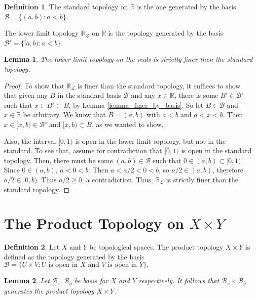 \documentclass{report}
\newtheorem{lemma}{Lemma}[section]
\theoremstyle{definition}
\newtheorem{definition}{Definition}[section]
\theoremstyle{remark}
\newcommand{\R}{\mathbb{R}}
\newcommand{\set}[1]{\{#1\}}
\newcommand{\prt}[1]{\mathcal{#1}}
\begin{document}
\begin{definition}
    The standard topology on $\R$ is the one generated by the basis $\prt{B} = \set{(a, b) : a < b}$.

    The lower limit topology $\R_{\prt{L}}$ on $\R$ is the topology generated by the basis $\prt{B'} = \set{[a, b) : a < b}$.
\end{definition}

\begin{lemma}
    The lower limit topology on the reals is strictly finer then the standard topology.
\end{lemma}

\begin{proof}
    To show that $\R_{\prt{L}}$ is finer than the standard topology, it suffices to show that given any $B$ in the standard basis $\prt{B}$ and any $x \in \R$, there is some $B' \in \prt{B'}$ such that $x \in B' \subset B$, by Lemma \ref{lemma_finer_by_basis}. So let $B \in \prt{B}$ and $x \in \R$ be arbitrary. We know that $B = (a, b)$ with $a < b$ and $a < x < b$. Then $x \in [x, b) \in \prt{B'}$ and $[x, b) \subset B$, as we wanted to show.
    
    Also, the interval $[0, 1)$ is open in the lower limit topology, but not in the standard. To see that, assume for contradiction that $[0, 1)$ is open in the standard topology. Then, there must be some $(a, b) \in \prt{B}$ such that $0 \in (a, b) \subset [0, 1)$. Since $0 \in (a, b)$, $a < 0 < b$. Then $a < a/2 < 0 < b$, so $a/2 \in (a, b)$, therefore $a/2 \in [0, b)$. Thus $a/2 \geq 0$, a contradiction. Thus, $\R_{\prt{L}}$ is strictly finer than the standard topology.
\end{proof}

\section{The Product Topology on \texorpdfstring{$X \times Y$}{X x Y}}

\begin{definition}
    Let $X$ and $Y$ be topological spaces. The product topology $X \times Y$ is defined as the topology generated by the basis $\prt{B} = \set{U \times V : \text{$U$ is open in $X$ and $V$ is open in $Y$}}.$
\end{definition}

\begin{lemma}
    Let $\prt{B}_x, \prt{B}_y$ be basis for $X$ and $Y$ respectively. It follows that $\prt{B}_x \times \prt{B}_y$ generates the product topology $X \times Y$.
\end{lemma}
\end{document}
